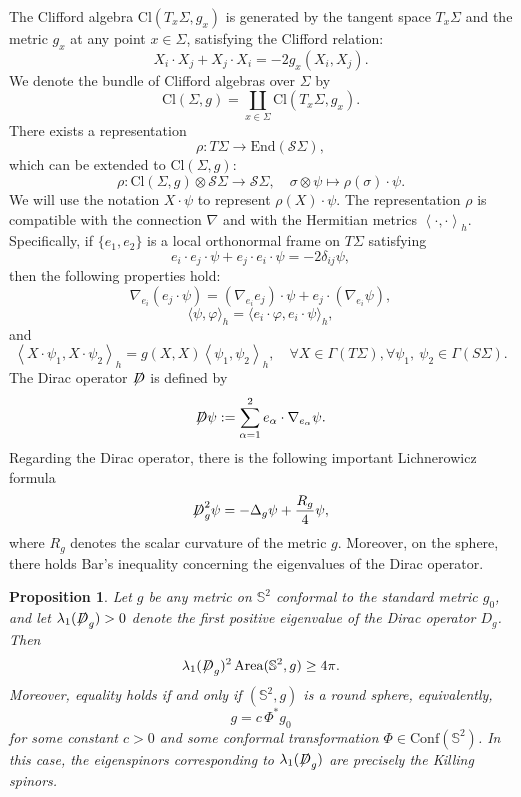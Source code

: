 \documentclass[a4paper, 12pt]{article}
\newtheorem{proposition}[theorem]{Proposition}
\def\slashiii#1{\setbox0=\hbox{$#1$}#1\hskip-\wd0\hbox to\wd0{\hss\sl/\/\hss}}
\begin{document}
The Clifford algebra \(\text{Cl}(T_x\Sigma, g_x)\) is generated by the tangent space \(T_x\Sigma\) and the metric \(g_x\) at any point \(x \in \Sigma\), satisfying the Clifford relation:
\begin{equation}\label{Clifford}
	X_i \cdot X_j + X_j \cdot X_i = -2g_x(X_i, X_j).
\end{equation}
We denote the bundle of Clifford algebras over \(\Sigma\) by
\[
\text{Cl}(\Sigma,g) = \coprod_{x \in \Sigma} \text{Cl}(T_x\Sigma, g_x).
\]
There exists a representation
\[
\rho: T\Sigma \to \text{End}(\mathcal{S}\Sigma),
\]
which can be extended to \(\text{Cl}(\Sigma,g)\):
\[
\rho: \text{Cl}(\Sigma,g) \otimes \mathcal{S}\Sigma \to \mathcal{S}\Sigma, \quad \sigma \otimes \psi \mapsto \rho(\sigma) \cdot \psi.
\]
We will use the notation \(X \cdot \psi\) to represent \(\rho(X) \cdot \psi\). The representation \(\rho\) is compatible with the connection \(\nabla\) and with the Hermitian metrics
${\left\langle { \cdot , \cdot } \right\rangle _h}$. Specifically, if \(\{e_1, e_2\}\) is a local orthonormal frame on \(T\Sigma\) satisfying
\[
e_i \cdot e_j \cdot \psi + e_j \cdot e_i \cdot \psi = -2\delta_{ij} \psi,
\]
then the following properties hold:
\[
\nabla_{e_i}(e_j \cdot \psi) = (\nabla_{e_i} e_j) \cdot \psi + e_j \cdot (\nabla_{e_i} \psi),
\]
\[
\langle \psi, \varphi \rangle_h = \langle e_i \cdot \varphi, e_i \cdot \psi \rangle_h,
\]
and
\begin{equation}\label{Clofford-inner-product}
	{\left\langle {X \cdot {\psi _1},X \cdot {\psi _2}} \right\rangle _h} = {g}\left( {X,X} \right){\left\langle {{\psi _1},{\psi _2}} \right\rangle _h},\quad\forall X \in \Gamma \left( {T\Sigma } \right),\forall {\psi _1},\ {\psi _2} \in \Gamma \left( {S\Sigma } \right).
\end{equation}
The Dirac operator \(\slashiii{D}\) is defined by
\[
\slashiii{D} \psi := \sum_{\alpha=1}^2 e_\alpha \cdot \nabla_{e_\alpha} \psi.
\]
Regarding the Dirac operator, there is the following important Lichnerowicz formula
\begin{equation}\label{Lichnerowicz}
	\slashiii{D}_g^2\psi  =  - {\Delta _g}\psi  + \frac{{{R_g}}}{4}\psi,
\end{equation}
where \( R_g \) denotes the scalar curvature of the metric \( g \). Moreover, on the sphere, there holds Bar's inequality \cite{MR1162671} concerning the eigenvalues of the Dirac operator.
\begin{proposition}
	Let $g$ be any metric on $\mathbb{S}^2$ conformal to the standard metric $g_0$, and let
	$\lambda_1(\slashiii{D}_g)>0$
	denote the first positive eigenvalue of the Dirac operator $D_g$.
	Then
	\begin{equation}\label{Bar-inq}
		\lambda_1(\slashiii{D}_g)^2\operatorname{Area}(\mathbb{S}^2,g)\ge 4\pi.
	\end{equation}
	Moreover, equality holds if and only if $(\mathbb{S}^2,g)$ is a round sphere, equivalently,
	\[
	g=c\,\Phi^*g_0
	\]
	for some constant $c>0$ and some conformal transformation
	$\Phi\in \mathrm{Conf}(\mathbb{S}^2)$.
	In this case, the eigenspinors corresponding to $\lambda_1(\slashiii{D}_g)$ are precisely the Killing spinors.
\end{proposition}
\end{document}
